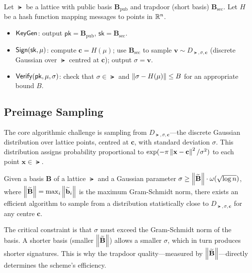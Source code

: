 \begin{definition}
\label{def:gpv-signature}
Let $\lat$ be a lattice with public basis $\mathbf{B}_{\mathrm{pub}}$ and trapdoor (short basis) $\mathbf{B}_{\mathrm{sec}}$.  Let $H$ be a hash function mapping messages to points in $\mathbb{R}^n$.
\begin{itemize}
\item $\mathsf{KeyGen}$: output $\mathsf{pk} = \mathbf{B}_{\mathrm{pub}}$, $\mathsf{sk} = \mathbf{B}_{\mathrm{sec}}$.
\item $\mathsf{Sign}(\mathsf{sk}, \mu)$: compute $\mathbf{c} = H(\mu)$; use $\mathbf{B}_{\mathrm{sec}}$ to sample $\mathbf{v} \sim D_{\lat, \sigma, \mathbf{c}}$ (discrete Gaussian over $\lat$ centred at $\mathbf{c}$); output $\sigma = \mathbf{v}$.
\item $\mathsf{Verify}(\mathsf{pk}, \mu, \sigma)$: check that $\sigma \in \lat$ and $\left\lVert \sigma - H(\mu) \right\rVert \leq B$ for an appropriate bound $B$.
\end{itemize}
\end{definition}

\subsection{Preimage Sampling}
\label{subsec:preimage-sampling}

The core algorithmic challenge is sampling from $D_{\lat, \sigma, \mathbf{c}}$---the discrete Gaussian distribution over lattice points, centred at $\mathbf{c}$, with standard deviation $\sigma$.  This distribution assigns probability proportional to $\exp(-\pi\left\lVert \mathbf{x} - \mathbf{c} \right\rVert^2/\sigma^2)$ to each point $\mathbf{x} \in \lat$.

\begin{theorem}
\label{thm:gpv-sampling}
Given a basis $\mathbf{B}$ of a lattice $\lat$ and a Gaussian parameter $\sigma \geq \left\lVert \widetilde{\mathbf{B}} \right\rVert \cdot \omega(\sqrt{\log n})$, where $\left\lVert \widetilde{\mathbf{B}} \right\rVert = \max_i \left\lVert \widetilde{\mathbf{b}}_i \right\rVert$ is the maximum Gram-Schmidt norm, there exists an efficient algorithm to sample from a distribution statistically close to $D_{\lat, \sigma, \mathbf{c}}$ for any centre $\mathbf{c}$.
\end{theorem}

The critical constraint is that $\sigma$ must exceed the Gram-Schmidt norm of the basis.  A shorter basis (smaller $\left\lVert \widetilde{\mathbf{B}} \right\rVert$) allows a smaller $\sigma$, which in turn produces shorter signatures.  This is why the trapdoor quality---measured by $\left\lVert \widetilde{\mathbf{B}} \right\rVert$---directly determines the scheme's efficiency.

